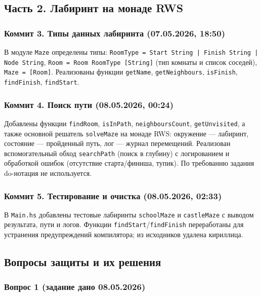 \documentclass[a4paper, final]{article}
\begin{document}
\subsection{Часть 2. Лабиринт на монаде RWS}

\subsubsection{Коммит 3. Типы данных лабиринта (07.05.2026, 18:50)}

В модуле \texttt{Maze} определены типы:
\texttt{RoomType = Start String | Finish String | Node String},
\texttt{Room = Room RoomType [String]} (тип комнаты и список соседей),
\texttt{Maze = [Room]}. Реализованы функции \texttt{getName},
\texttt{getNeighbours}, \texttt{isFinish}, \texttt{findFinish},
\texttt{findStart}.

\subsubsection{Коммит 4. Поиск пути (08.05.2026, 00:24)}

Добавлены функции \texttt{findRoom}, \texttt{isInPath},
\texttt{neighboursCount}, \texttt{getUnvisited}, а также основной
решатель \texttt{solveMaze} на монаде RWS: окружение — лабиринт, состояние —
пройденный путь, лог — журнал перемещений. Реализован вспомогательный обход
\texttt{searchPath} (поиск в глубину) с логированием и обработкой ошибок
(отсутствие старта/финиша, тупик). По требованию задания do-нотация не
используется.

\subsubsection{Коммит 5. Тестирование и очистка (08.05.2026, 02:33)}

В \texttt{Main.hs} добавлены тестовые лабиринты \texttt{schoolMaze} и
\texttt{castleMaze} с выводом результата, пути и логов. Функции
\texttt{findStart}/\texttt{findFinish} переработаны для устранения
предупреждений компилятора; из исходников удалена кириллица.

\subsection{Вопросы защиты и их решения}

\subsubsection{Вопрос 1 (задание дано 08.05.2026)}
\end{document}
